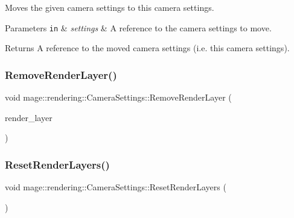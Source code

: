 Moves the given camera settings to this camera settings.


\begin{DoxyParams}[1]{Parameters}
\mbox{\tt in}  & {\em settings} & A reference to the camera settings to move. \\
\hline
\end{DoxyParams}
\begin{DoxyReturn}{Returns}
A reference to the moved camera settings (i.\+e. this camera settings). 
\end{DoxyReturn}
\hypertarget{classmage_1_1rendering_1_1_camera_settings_a49c766f4880c798a90a9b8fe488a6711}{}\label{classmage_1_1rendering_1_1_camera_settings_a49c766f4880c798a90a9b8fe488a6711} 
\subsubsection{\texorpdfstring{Remove\+Render\+Layer()}{RemoveRenderLayer()}}
{\footnotesize\ttfamily void mage\+::rendering\+::\+Camera\+Settings\+::\+Remove\+Render\+Layer (\begin{DoxyParamCaption}\item[{\hyperlink{namespacemage_1_1rendering_a466c2a441ea5b26e4625c2f34e021b3d}{Render\+Layer}}]{render\+\_\+layer }\end{DoxyParamCaption})\hspace{0.3cm}{\ttfamily [noexcept]}}

\hypertarget{classmage_1_1rendering_1_1_camera_settings_a954a0af8d7939069e32b77abc23f95d0}{}\label{classmage_1_1rendering_1_1_camera_settings_a954a0af8d7939069e32b77abc23f95d0} 
\subsubsection{\texorpdfstring{Reset\+Render\+Layers()}{ResetRenderLayers()}}
{\footnotesize\ttfamily void mage\+::rendering\+::\+Camera\+Settings\+::\+Reset\+Render\+Layers (\begin{DoxyParamCaption}{ }\end{DoxyParamCaption})\hspace{0.3cm}{\ttfamily [noexcept]}}

